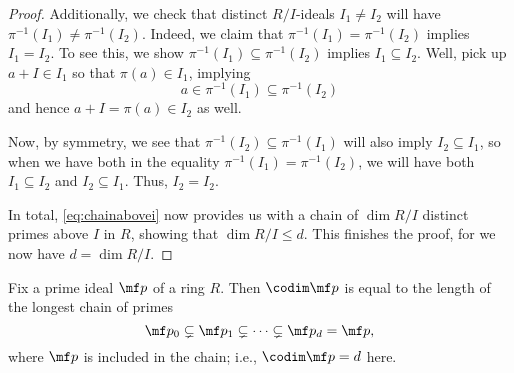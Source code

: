 \begin{proof}
	Additionally, we check that distinct $R/I$-ideals $I_1\ne I_2$ will have $\pi^{-1}(I_1)\ne\pi^{-1}(I_2)$. Indeed, we claim that $\pi^{-1}(I_1)=\pi^{-1}(I_2)$ implies $I_1=I_2$. To see this, we show $\pi^{-1}(I_1)\subseteq\pi^{-1}(I_2)$ implies $I_1\subseteq I_2$. Well, pick up $a+I\in I_1$ so that $\pi(a)\in I_1$, implying
	\[a\in\pi^{-1}(I_1)\subseteq\pi^{-1}(I_2)\]
	and hence $a+I=\pi(a)\in I_2$ as well.
	
	Now, by symmetry, we see that $\pi^{-1}(I_2)\subseteq\pi^{-1}(I_1)$ will also imply $I_2\subseteq I_1$, so when we have both in the equality $\pi^{-1}(I_1)=\pi^{-1}(I_2)$, we will have both $I_1\subseteq I_2$ and $I_2\subseteq I_1$. Thus, $I_2=I_2$.

	In total, \autoref{eq:chainabovei} now provides us with a chain of $\dim R/I$ distinct primes above $I$ in $R$, showing that $\dim R/I\le d$. This finishes the proof, for we now have $d=\dim R/I$.
\end{proof}
\begin{lemma} \label{lem:codimisdescend}
	Fix a prime ideal $\mf p$ of a ring $R$. Then $\codim\mf p$ is equal to the length of the longest chain of primes
	\[\mf p_0\subsetneq\mf p_1\subsetneq\cdots\subsetneq\mf p_d=\mf p,\]
	where $\mf p$ is included in the chain; i.e., $\codim\mf p=d$ here.
\end{lemma}
